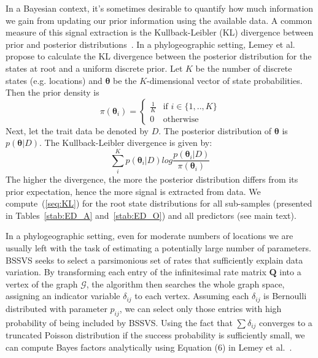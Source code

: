 \documentclass[a4paper,10pt]{article}
\begin{document}
In a Bayesian context, it's sometimes desirable to quantify how much information we gain from updating our prior information using the available data.
A common measure of this signal extraction is the Kullback-Leibler (KL) divergence between prior and posterior distributions~\cite{M-KL}.
In a phylogeographic setting, Lemey et al. \cite{M-roots} propose to calculate the KL divergence between the posterior distribution for the states at root and a uniform discrete prior.
Let $K$ be the number of discrete states (e.g. locations) and $\boldsymbol\theta$ be the $K$-dimensional vector of state probabilities.
Then the prior density is
\begin{equation}
\label{seq:prior}
\pi(\boldsymbol\theta_i)  = \begin{cases}  \frac{1}{K} &\mbox{if } i \in \{1,..,K\}  \\ 
0 & \mbox{otherwise} \end{cases}
\end{equation}
Next, let the trait data be denoted by $D$.
The posterior distribution of $\boldsymbol\theta$ is $p(\boldsymbol\theta|D)$.
The Kullback-Leibler divergence is given by:
\begin{equation}
\label{seq:KL}
\sum_{i}^{K} p(\boldsymbol\theta_i|D)log\frac{p(\boldsymbol\theta_i|D)}{\pi(\boldsymbol\theta_i)}
\end{equation}
The higher the divergence, the more the posterior distribution differs from its prior expectation, hence the more signal is extracted from data.
We compute~(\ref{seq:KL}) for the root state distributions for all sub-samples (presented in Tables~\ref{stab:ED_A} and~\ref{stab:ED_O}) and all predictors (see main text).

In a phylogeographic setting, even for moderate numbers of locations we are usually left with the task of estimating a potentially large number of parameters. 
BSSVS seeks to select a parsimonious set of rates that sufficiently explain data variation.
By transforming each entry of the infinitesimal rate matrix $\mathbf{Q}$ into a vertex of the graph $\mathcal{G}$, the algorithm then searches the whole graph space, assigning an indicator variable $\delta_{ij}$ to each vertex.
Assuming each $\delta_{ij}$ is Bernoulli distributed with parameter $p_{ij}$, we can select only those entries with high probability of being included by BSSVS.
Using the fact that $\sum\delta_{ij}$ converges to a truncated Poisson distribution if the success probability is sufficiently small, we can compute Bayes factors analytically using Equation (6) in Lemey et al.~\cite{M-roots}.
\end{document}

